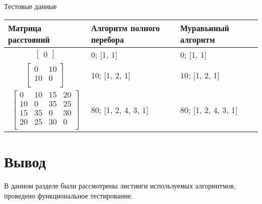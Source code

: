 \begin{center}
\begin{threeparttable}
	\caption{Тестовые данные}
	\label{tabular:testsdata}
	\begin{tabular}{|p{6cm}|p{5cm}|p{4cm}|}
		\hline
		\textbf{Матрица расстояний} & \textbf{Алгоритм полного перебора} & \textbf{Муравьиный алгоритм}
		\tabularnewline
		\hline
		\begin{equation*}
			\begin{bmatrix}
				0
			\end{bmatrix}
		\end{equation*} & 0; [1, 1] & 0; [1, 1]
		\tabularnewline
		\hline
		\begin{equation*}
			\begin{bmatrix}
				0 & 10 \\
				10 & 0 \\
			\end{bmatrix}
		\end{equation*} & 10; [1, 2, 1] & 10; [1, 2, 1]
		\tabularnewline
		\hline
		\begin{equation*}
			\begin{bmatrix}
				0 & 10 & 15 & 20 \\
				10 & 0 & 35 & 25 \\
				15 & 35 & 0 & 30 \\
				20 & 25 & 30 & 0 \\
			\end{bmatrix}
		\end{equation*} & 80; [1, 2, 4, 3, 1] & 80; [1, 2, 4, 3, 1]
		\tabularnewline
		\hline
	\end{tabular}
\end{threeparttable}
\end{center}

\section*{\hsp Вывод}
В данном разделе были рассмотрены листинги используемых алгориитмов, проведено функциональное тестирование.
